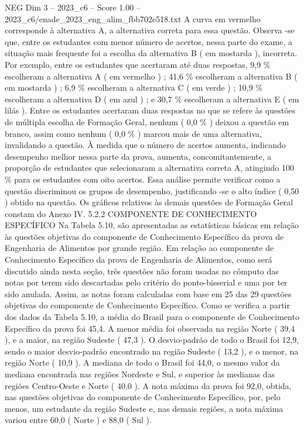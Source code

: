 \begin{textsample}{NEG Dim 3 – 2023\_c6 – Score 1.00 – 2023\_c6/enade\_2023\_eng\_alim\_fbb702e518.txt}
A curva em vermelho corresponde à alternativa A, a alternativa correta para essa questão.
Observa -se que, entre os estudantes com menor número de acertos, nessa parte do exame, a situação mais frequente foi a escolha da alternativa B ( em mostarda ), incorreta.
Por exemplo, entre os estudantes que acertaram até duas respostas, 9,9 \% escolheram a alternativa A ( em vermelho ) ; 41,6 \% escolheram a alternativa B ( em mostarda ) ; 6,9 \% escolheram a alternativa C ( em verde ) ; 10,9 \% escolheram a alternativa D ( em azul ) ; e 30,7 \% escolheram a alternativa E ( em lilás ).
Entre os estudantes acertaram duas respostas no que se refere às questões de múltipla escolha de Formação Geral, nenhum ( 0,0 \% ) deixou a questão em branco, assim como nenhum ( 0,0 \% ) marcou mais de uma alternativa, invalidando a questão.
À medida que o número de acertos aumenta, indicando desempenho melhor nessa parte da prova, aumenta, concomitantemente, a proporção de estudantes que selecionaram a alternativa correta A, atingindo 100 \% para os estudantes com oito acertos.
Essa análise permite verificar como a questão discriminou os grupos de desempenho, justificando -se o alto índice ( 0,50 ) obtido na questão.
Os gráficos relativos às demais questões de Formação Geral constam do Anexo IV. 5.2.2 COMPONENTE DE CONHECIMENTO ESPECÍFICO Na Tabela 5.10, são apresentadas as estatísticas básicas em relação às questões objetivas do componente de Conhecimento Específico da prova de Engenharia de Alimentos por grande região.
Em relação ao componente de Conhecimento Específico da prova de Engenharia de Alimentos, como será discutido ainda nesta seção, três questões não foram usadas no cômputo das notas por terem sido descartadas pelo critério do ponto-bisserial e uma por ter sido anulada.
Assim, as notas foram calculadas com base em 25 das 29 questões objetivas do componente de Conhecimento Específico.
Como se verifica a partir dos dados da Tabela 5.10, a média do Brasil para o componente de Conhecimento Específico da prova foi 45,4.
A menor média foi observada na região Norte ( 39,4 ), e a maior, na região Sudeste ( 47,3 ).
O desvio-padrão de todo o Brasil foi 12,9, sendo o maior desvio-padrão encontrado na região Sudeste ( 13,2 ), e o menor, na região Norte ( 10,9 ).
A mediana de todo o Brasil foi 44,0, o mesmo valor da mediana encontrada nas regiões Nordeste e Sul, e superior às medianas das regiões Centro-Oeste e Norte ( 40,0 ).
A nota máxima da prova foi 92,0, obtida, nas questões objetivas do componente de Conhecimento Específico, por, pelo menos, um estudante da região Sudeste e, nas demais regiões, a nota máxima variou entre 60,0 ( Norte ) e 88,0 ( Sul ).

\end{textsample}
